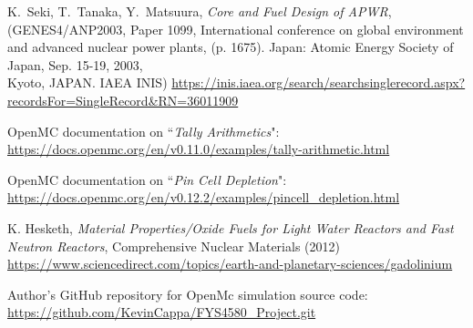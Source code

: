 \documentclass[twocolumn,a4paper,10pt]{article}
\begin{document}
\vfill\null
\newpage


\small
{}

\begin{thebibliography}{}

K.~Seki, T.~Tanaka, Y.~Matsuura, \textit{Core and Fuel Design of APWR}, (GENES4/ANP2003,
Paper 1099,  International conference on global environment and advanced nuclear power plants, (p. 1675). Japan: Atomic Energy Society of Japan, Sep. 15-19, 2003,\\ Kyoto, JAPAN. IAEA INIS)
\url{https://inis.iaea.org/search/searchsinglerecord.aspx?recordsFor=SingleRecord&RN=36011909}

OpenMC documentation on ``\textit{Tally Arithmetics}":\\
\url{https://docs.openmc.org/en/v0.11.0/examples/tally-arithmetic.html}

OpenMC documentation on ``\textit{Pin Cell Depletion}":\\
\url{https://docs.openmc.org/en/v0.12.2/examples/pincell_depletion.html}

K. Hesketh, \textit{Material Properties/Oxide Fuels for Light Water Reactors and Fast Neutron Reactors}, Comprehensive Nuclear Materials (2012)\\
\url{https://www.sciencedirect.com/topics/earth-and-planetary-sciences/gadolinium}

Author's GitHub repository for OpenMc simulation source code:\\
\url{https://github.com/KevinCappa/FYS4580_Project.git}

\end{thebibliography}
\vfill\null
\newpage


\end{document}
